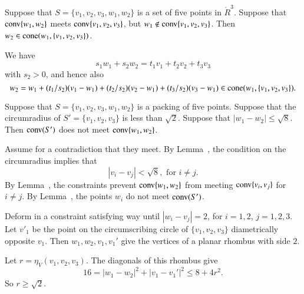 \begin{tarskidata}
\begin{tarski}
\begin{lemma}
Suppose that $S=\{v_1,v_2,v_3,w_1,w_2\}$
is a set of five points in  $\ring{R}^3$.  Suppose
that  ${\operatorname{conv}}\{w_1,w_2\}$ meets ${\operatorname{conv}}\{v_1,v_2,v_3\}$,
but $w_1\not\in{\operatorname{conv}}\{v_1,v_2,v_3\}$.
Then $w_2\in{\operatorname{cone}}(w_1,\{v_1,v_2,v_3\})$.
\end{lemma}

\begin{proved}
We have 
  $$
  s_1 w_1 + s_2 w_2 = t_1 v_1 + t_2 v_2 + t_3 v_3
  $$
with $s_2>0$,
and hence also
  $$
  w_2 = w_1 + (t_1/s_2) (v_1-w_1) + 
       (t_2/s_2) (v_2 - w_1) + (t_3/s_2) (v_3-w_1)\in 
   {\operatorname{cone}}(w_1,\{v_1,v_2,v_3\}).
  $$
\swallowed\end{proved}
\end{tarski}





\begin{tarski}

\begin{lemma}
Suppose that  $S=\{v_1,v_2,v_3,w_1,w_2\}$
is a packing of five points.
Suppose that the circumradius of $S'=\{v_1,v_2,v_3\}$ is less than
$\sqrt2$.  Suppose that $|w_1-w_2|\le \sqrt8$.  Then
${\operatorname{conv}}(S')$ does not meet ${\operatorname{conv}}\{w_1,w_2\}$.
\end{lemma}

\begin{proved}  Assume for a contradiction that they meet. 
By Lemma~, the condition on the circumradius implies that
	$$|v_i-v_j| < \sqrt8, \text{ for } i\ne j.$$
By Lemma~, the constraints prevent 	${\operatorname{conv}}\{w_1,w_2\}$
from meeting ${\operatorname{conv}}\{v_i,v_j\}$ for $i\ne j$.  By Lemma~,
the points $w_i$ do not meet ${\operatorname{conv}}(S')$.

Deform in a constraint satisfying way until $|w_i-v_j|=2$, for
$i=1,2$, $j=1,2,3$.    Let $v'_1$ be the
point on the circumscribing circle of $\{v_1,v_2,v_3\}$ diametrically
opposite $v_1$.  Then $w_1,w_2,v_1,v_1'$ give the vertices of a planar
rhombus with side $2$.

Let $r=\eta_V(v_1,v_2,v_3)$. The diagonals of this rhombus give
   $$
   16 = |w_1-w_2|^2 + |v_1-v_1'|^2 \le 8 + 4 r^2.
   $$
So $r\ge\sqrt2$.
\swallowed\end{proved}
\end{tarski}









\end{tarskidata}
